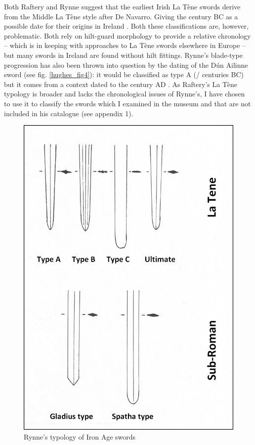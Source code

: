 Both Raftery and Rynne suggest that the earliest Irish La Tène swords derive from the Middle La Tène style after De Navarro. Giving the  century BC as a possible date for their origins in Ireland \parencites{DeNavarro1972}{Rynne1982}[83]{Raftery1983}. 
Both these classifications are, however, problematic. 
Both rely on hilt-guard morphology to provide a relative chronology -- which is in keeping with approaches to La Tène swords elsewhere in Europe 
\parencites(e.g.)(){DeNavarro1972}{Stead2006} -- but many swords in Ireland are found without hilt fittings. 
Rynne’s blade-type progression has also been thrown into question by the dating of the Dún Ailinne sword (see fig. \ref{hughes_fig4}): 
it would be classified as type A (/ centuries BC) but it comes from a context dated to the  century AD \parencite[88\psq]{Johnston2007}. 
As Raftery’s La Tène typology is broader and lacks the chronological issues of Rynne’s, I have chosen to use it to classify the swords which I examined in the museum and that are not included in his catalogue \parencite{Raftery1983} (see appendix 1).

\begin{figure}
\includegraphics[width=\linewidth]{figures/Hughes_Sword_fig03.jpg} 
\caption{Rynne's typology of Iron Age swords \parencite[after][]{Rynne1976}}
\label{hughes_fig3}
\end{figure}

